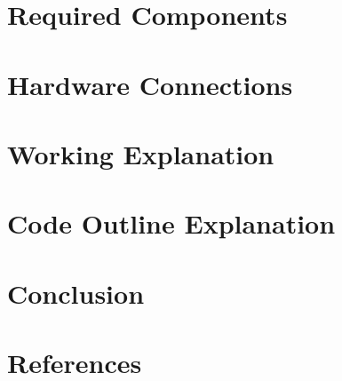 \documentclass[journal]{IEEEtran}
\begin{document}

\vspace{3cm}


\renewcommand{\thefigure}{\theenumi}
\renewcommand{\thetable}{\theenumi}
\setlength{\intextsep}{10pt} %

\renewcommand{\thetable}{\theenumi}




\newpage

\renewcommand{\baselinestretch}{1}\normalsize
\tableofcontents
\renewcommand{\baselinestretch}{1}\normalsize


\newpage
{} 

\section{Required Components} \label{ch1}
 
\label{EndOfText}



\section{Hardware Connections} \label{ch1}
 
\label{EndOfText}

\section{Working Explanation } \label{ch1}
 
\label{EndOfText}
\label{endOfDoc}


\section{Code Outline Explanation } \label{ch1}
 
\label{EndOfText}
\label{endOfDoc}


\section{Conclusion} \label{ch1}
 
\label{EndOfText}
\label{endOfDoc}


\section{References} \label{ch1}
 
\label{EndOfText}
\label{endOfDoc}
\end{document}
